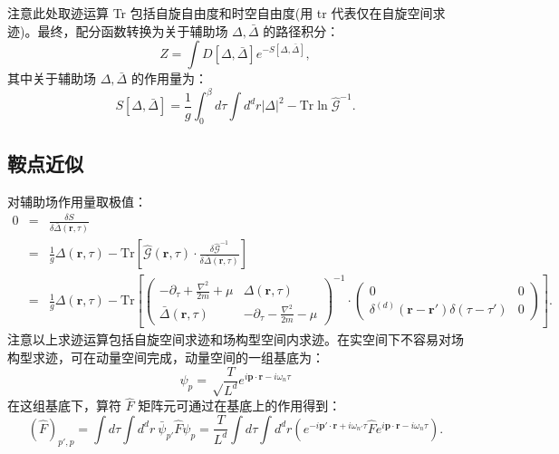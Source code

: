 \documentclass[10pt,UTF8]{ctexart}
\begin{document}
注意此处取迹运算 Tr 包括自旋自由度和时空自由度(用 tr 代表仅在自旋空间求迹)。最终，配分函数转换为关于辅助场 $\Delta,\bar\Delta$ 的路径积分：
\begin{equation}
	Z = \int D[\Delta,\bar\Delta] e^{-S[\Delta, \bar\Delta]},
\end{equation}
其中关于辅助场 $\Delta,\bar\Delta$ 的作用量为：
\begin{equation}
	S[\Delta, \bar\Delta] = \frac{1}{g}\int_0^\beta d\tau \int d^d r |\Delta|^2 - \mathrm{Tr} \ln \hat{\mathcal G}^{-1}.
\end{equation}

\subsection*{鞍点近似}
\noindent 对辅助场作用量取极值：
\begin{eqnarray}
	0 &=& \frac{\delta S}{\delta \bar\Delta(\bm r,\tau)} \nonumber \\
	&=& \frac{1}{g} \Delta(\bm r,\tau) - \mathrm{Tr} 
	\left[\hat{\mathcal G}(\bm r,\tau) \cdot \frac{\delta \hat{\mathcal G}^{-1}}{\delta \bar\Delta(\bm r,\tau)} 
	\right] \nonumber \\
	&=& \frac{1}{g} \Delta(\bm r,\tau) - \mathrm{Tr} \left[ 
	\left(
	\begin{array}{cc}
		-\partial_\tau + \frac{\nabla^2}{2m} +\mu & \Delta(\bm r,\tau) \\
		\bar\Delta(\bm r,\tau) & -\partial_\tau -\frac{\nabla^2}{2m} -\mu 
	\end{array} 
	\right)^{-1} \cdot 
	\left( 
	\begin{array}{cc}
		0 & 0 \\
		\delta^{(d)}(\bm r-\bm r')\delta(\tau-\tau') & 0 
	\end{array}
	\right)
	\right].
\end{eqnarray}
注意以上求迹运算包括自旋空间求迹和场构型空间内求迹。在实空间下不容易对场构型求迹，可在动量空间完成，动量空间的一组基底为：
\begin{equation}
	\psi_{p} = \sqrt\frac{T}{L^d} e^{i\bm p \cdot \bm r - i\omega_n \tau}
\end{equation}
在这组基底下，算符 $\hat F$ 矩阵元可通过在基底上的作用得到：
\begin{equation}
	(\hat F)_{p',p} = \int d\tau \int d^d r \ \bar \psi_{p'} \hat F \psi_p
	= \frac{T}{L^d} \int d\tau \int d^d r\left( e^{-i\bm p' \cdot \bm r + i\omega_{n'} \tau} \hat F e^{i\bm p \cdot \bm r - i\omega_n \tau} \right).
\end{equation}
\end{document}
